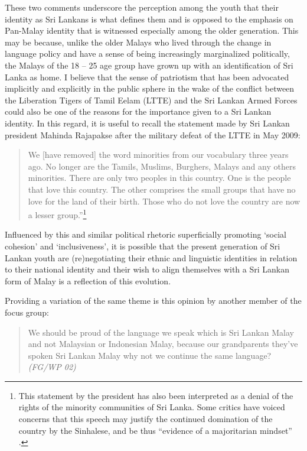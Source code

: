 These two comments underscore the perception among the youth that their identity as Sri Lankans is what defines them and is opposed to the emphasis on Pan-Malay identity that is witnessed especially among the older generation. This may be because, unlike the older Malays who lived through the change in language policy and have a sense of being increasingly marginalized politically, the Malays of the 18 -- 25 age group have grown up with an identification of Sri Lanka as home. I believe that the sense of patriotism that has been advocated implicitly and explicitly in the public sphere in the wake of the conflict between the Liberation Tigers of Tamil Eelam (LTTE) and the Sri Lankan Armed Forces could also be one of the reasons for the importance given to a Sri Lankan identity. In this regard, it is useful to recall the statement made by Sri Lankan president Mahinda Rajapakse after the military defeat of the LTTE in May 2009: 


\begin{quote} 
We [have removed] the word minorities from our vocabulary three years ago. No longer are the Tamils, Muslims, Burghers, Malays and any others minorities. There are only two peoples in this country. One is the people that love this country. The other comprises the small groups that have no love for the land of their birth. Those who do not love the country are now a lesser group.''\footnote{This 
 statement by the president has also been interpreted as a denial of the rights of the minority communities of Sri Lanka. Some critics have voiced concerns that this speech may justify the continued domination of the country by the Sinhalese, and be thus ``evidence of a majoritarian mindset'' \citep{Ismail2009}.
}
\citep{Rajapakse2009}
\end{quote}

 Influenced by this and similar political rhetoric superficially promoting `social cohesion' and `inclusiveness', it is possible that the present generation of Sri Lankan youth are (re)negotiating their ethnic and linguistic identities in relation to their national identity and their wish to align themselves with a Sri Lankan form of Malay is a reflection of this evolution.  

Providing a variation of the same theme is this opinion by another member of the focus group:

\begin{quote}
We should be proud of the language we speak which is Sri Lankan Malay and not Malaysian or Indonesian Malay, because our grandparents they've spoken Sri Lankan Malay why not we continue the same language?
 \textit{(FG/WP 02)}
\end{quote}

